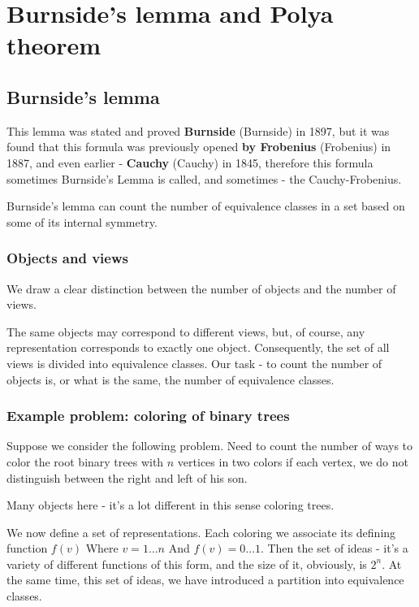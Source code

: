 \section{ Burnside's lemma and Polya theorem }
\subsection{ Burnside's lemma }

This lemma was stated and proved \textbf{Burnside} (Burnside) in 1897, but it was found that this formula was previously opened \textbf{by Frobenius} (Frobenius) in 1887, and even earlier - \textbf{Cauchy} (Cauchy) in 1845, therefore this formula sometimes Burnside's Lemma is called, and sometimes - the Cauchy-Frobenius.

Burnside's lemma can count the number of equivalence classes in a set based on some of its internal symmetry.

\subsubsection{ Objects and views }

We draw a clear distinction between the number of objects and the number of views.

The same objects may correspond to different views, but, of course, any representation corresponds to exactly one object. Consequently, the set of all views is divided into equivalence classes. Our task - to count the number of objects is, or what is the same, the number of equivalence classes.

\subsubsection{ Example problem: coloring of binary trees }

Suppose we consider the following problem. Need to count the number of ways to color the root binary trees with $n$ vertices in two colors if each vertex, we do not distinguish between the right and left of his son.

Many objects here - it's a lot different in this sense coloring trees.

We now define a set of representations. Each coloring we associate its defining function $f (v)$ Where $v = 1 \ldots n$ And $f (v) = 0 \ldots 1$. Then the set of ideas - it's a variety of different functions of this form, and the size of it, obviously, is $2 ^ n$. At the same time, this set of ideas, we have introduced a partition into equivalence classes.

